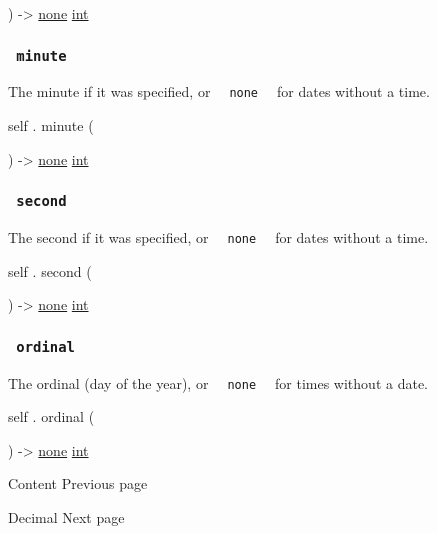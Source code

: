 ) -\textgreater{} \href{/docs/reference/foundations/none/}{none}
\href{/docs/reference/foundations/int/}{int}

\subsubsection{\texorpdfstring{\texttt{\ minute\ }}{ minute }}\label{definitions-minute}

The minute if it was specified, or
\texttt{\ }{\texttt{\ none\ }}\texttt{\ } for dates without a time.

self { . } { minute } (

) -\textgreater{} \href{/docs/reference/foundations/none/}{none}
\href{/docs/reference/foundations/int/}{int}

\subsubsection{\texorpdfstring{\texttt{\ second\ }}{ second }}\label{definitions-second}

The second if it was specified, or
\texttt{\ }{\texttt{\ none\ }}\texttt{\ } for dates without a time.

self { . } { second } (

) -\textgreater{} \href{/docs/reference/foundations/none/}{none}
\href{/docs/reference/foundations/int/}{int}

\subsubsection{\texorpdfstring{\texttt{\ ordinal\ }}{ ordinal }}\label{definitions-ordinal}

The ordinal (day of the year), or
\texttt{\ }{\texttt{\ none\ }}\texttt{\ } for times without a date.

self { . } { ordinal } (

) -\textgreater{} \href{/docs/reference/foundations/none/}{none}
\href{/docs/reference/foundations/int/}{int}

\href{/docs/reference/foundations/content/}{\pandocbounded{}}

{ Content } { Previous page }

\href{/docs/reference/foundations/decimal/}{\pandocbounded{}}

{ Decimal } { Next page }

